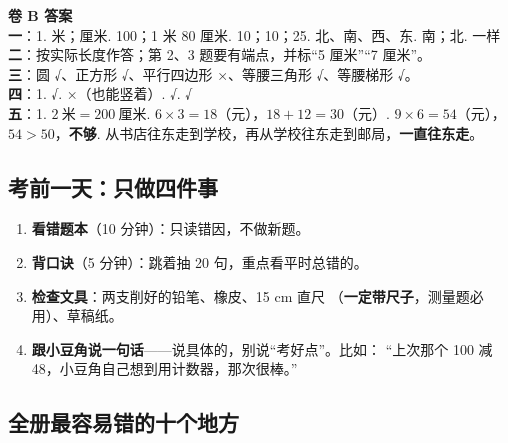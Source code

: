 \begin{ansbox}
\textbf{卷 B 答案}\\
\textbf{一}：1. 米；厘米. 100；1 米 80 厘米. 10；10；25. 北、南、西、东. 南；北. 一样 \\
\textbf{二}：按实际长度作答；第 2、3 题要有端点，并标“5 厘米”“7 厘米”。\\
\textbf{三}：圆 √、正方形 √、平行四边形 ×、等腰三角形 √、等腰梯形 √。\\
\textbf{四}：1. √. ×（也能竖着）. √. √ \\
\textbf{五}：1. $2\ \text{米}=200\ \text{厘米}$. $6\times3=18$（元），$18+12=30$（元）. $9\times6=54$（元），$54>50$，\textbf{不够}. 从书店往东走到学校，再从学校往东走到邮局，\textbf{一直往东走}。
\end{ansbox}

\subsection{考前一天：只做四件事}

\begin{enumerate}
  \item \textbf{看错题本}（10 分钟）：只读错因，不做新题。
  \item \textbf{背口诀}（5 分钟）：跳着抽 20 句，重点看平时总错的。
  \item \textbf{检查文具}：两支削好的铅笔、橡皮、15 cm 直尺
        （\textbf{一定带尺子}，测量题必用）、草稿纸。
  \item \textbf{跟小豆角说一句话}——说具体的，别说“考好点”。比如：
        “上次那个 100 减 48，小豆角自己想到用计数器，那次很棒。”
\end{enumerate}

\subsection{全册最容易错的十个地方}

